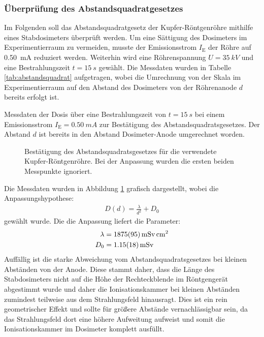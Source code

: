 \documentclass[11pt, a4paper]{article}
\numberwithin{equation}{section}
\begin{document}
\subsubsection{Überprüfung des Abstandsquadratgesetzes}
Im Folgenden soll das Abstandsquadratgesetz der Kupfer-Röntgenröhre mithilfe eines Stabdosimeters überprüft werden.
Um eine Sättigung des Dosimeters im Experimentierraum zu vermeiden, musste der Emissionsstrom $I_\mathrm{E}$ der Röhre auf \SI{0.50}{mA} reduziert werden.
Weiterhin wird eine Röhrenspannung $U = \SI{35}{kV}$ und eine Bestrahlungszeit $t = \SI{15}{s}$ gewählt.
Die Messdaten wurden in Tabelle \ref{tab:abstandsquadrat} aufgetragen, wobei die Umrechnung von der Skala im Experimentierraum auf den Abstand des Dosimeters von der Röhrenanode $d$ bereits erfolgt ist.
\begin{table}[h]
	\centering
	
	\caption{Messdaten der Dosis über eine Bestrahlungszeit von $t=\SI{15}{s}$ bei einem Emissionsstrom $I_\mathrm{E} = \SI{0.50}{mA}$ zur Bestätigung des Abstandsquadratsgesetzes. Der Abstand $d$ ist bereits in den Abstand Dosimeter-Anode umgerechnet worden.}
	\label{tab:abstandsquadrat}
\end{table}
\begin{figure}[h]
	\centering
	
	\caption{Bestätigung des Abstandsquadratsgesetzes für die verwendete Kupfer-Röntgenröhre. Bei der Anpassung wurden die ersten beiden Messpunkte ignoriert.}
	\label{fig:abstandsquadrat}
\end{figure}
Die Messdaten wurden in Abbildung \ref{fig:abstandsquadrat} grafisch dargestellt, wobei die Anpassungshypothese:
\begin{align}
	D(d) = \frac{\lambda}{d^2} + D_0
\end{align}
gewählt wurde.
Die die Anpassung liefert die Parameter:
\begin{align*}
	\lambda &= \SI{1875 +- 95}{\milli\sievert\centi\metre\squared}\\
	D_0 &= \SI{1.15 +- 0.18}{\milli\sievert}
\end{align*}
Auffällig ist die starke Abweichung vom Abstandsquadratsgesetzes bei kleinen Abständen von der Anode.
Diese stammt daher, dass die Länge des Stabdosimeters nicht auf die Höhe der Rechteckblende im Röntgengerät abgestimmt wurde und daher die Ionisationskammer bei kleinen Abständen zumindest teilweise aus dem Strahlungsfeld hinausragt.
Dies ist ein rein geometrischer Effekt und sollte für größere Abstände vernachlässigbar sein, da das Strahlungsfeld dort eine höhere Aufweitung aufweist und somit die Ionisationskammer im Dosimeter komplett ausfüllt.
\end{document}
